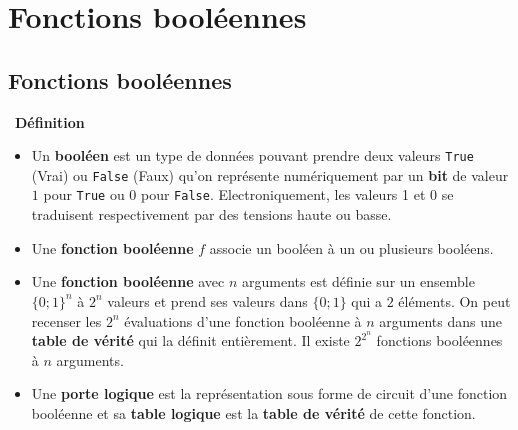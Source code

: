 \documentclass[
  11pt,
]{article}
\newcommand{\passthrough}[1]{#1}
\providecommand{\tightlist}{%
  \setlength{\itemsep}{0pt}\setlength{\parskip}{0pt}}
\newcounter{def}
\newenvironment{definition}[1]
{\par \medskip   \addtocounter{def}{1} \noindent  
\begin{bclogo}[arrondi =0.1,  ombre = true, barre=none, logo=\bcbook, marge=4]{~\textbf{Définition} \textbf{\thedef} {\itshape #1} }  \par}
{
\end{bclogo}
 \par \bigskip }
\newcounter{logi}
\begin{document}
\hypertarget{fonctions-booluxe9ennes}{%
\section{Fonctions booléennes}\label{fonctions-booluxe9ennes}}

\hypertarget{fonctions-booluxe9ennes-1}{%
\subsection{Fonctions booléennes}\label{fonctions-booluxe9ennes-1}}

\begin{definition}{}

\begin{itemize}
\tightlist
\item
  Un \textbf{booléen} est un type de données pouvant prendre deux
  valeurs \passthrough{\lstinline!True!} (Vrai) ou
  \passthrough{\lstinline!False!} (Faux) qu'on représente numériquement
  par un \textbf{bit} de valeur \(1\) pour
  \passthrough{\lstinline!True!} ou \(0\) pour
  \passthrough{\lstinline!False!}. Electroniquement, les valeurs 1 et 0
  se traduisent respectivement par des tensions haute ou basse.
\item
  Une \textbf{fonction booléenne} \(f\) associe un booléen à un ou
  plusieurs booléens.
\item
  Une \textbf{fonction booléenne} avec \(n\) arguments est définie sur
  un ensemble \(\{0;1\}^n\) à \(2^n\) valeurs et prend ses valeurs dans
  \(\{0;1\}\) qui a \(2\) éléments. On peut recenser les \(2^n\)
  évaluations d'une fonction booléenne à \(n\) arguments dans une
  \textbf{table de vérité} qui la définit entièrement. Il existe
  \(2^{2^n}\) fonctions booléennes à \(n\) arguments.
\item
  Une \textbf{porte logique} est la représentation sous forme de circuit
  d'une fonction booléenne et sa \textbf{table logique} est la
  \textbf{table de vérité} de cette fonction.
\end{itemize}

\end{definition}
\end{document}
